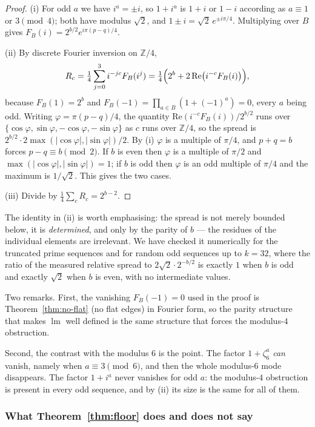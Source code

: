 \documentclass[11pt,a4paper]{article}
\theoremstyle{plain}
\theoremstyle{definition}
\theoremstyle{remark}
\DeclareMathOperator{\lm}{lm}
\begin{document}
\begin{proof}
(i) For odd $a$ we have $i^{a}=\pm i$, so $1+i^{a}$ is $1+i$ or $1-i$ according
as $a\equiv1$ or $3\pmod4$; both have modulus $\sqrt2$, and
$1\pm i=\sqrt2\,e^{\pm i\pi/4}$. Multiplying over $B$ gives
$F_B(i)=2^{b/2}e^{i\pi(p-q)/4}$.

(ii) By discrete Fourier inversion on $\mathbb{Z}/4$,
\[
  R_c=\tfrac14\sum_{j=0}^{3}i^{-jc}F_B(i^{j})
     =\tfrac14\Bigl(2^{b}+2\,\mathrm{Re}\bigl(i^{-c}F_B(i)\bigr)\Bigr),
\]
because $F_B(1)=2^{b}$ and $F_B(-1)=\prod_{a\in B}(1+(-1)^{a})=0$, every $a$
being odd. Writing $\varphi=\pi(p-q)/4$, the quantity
$\mathrm{Re}(i^{-c}F_B(i))/2^{b/2}$ runs over
$\{\cos\varphi,\sin\varphi,-\cos\varphi,-\sin\varphi\}$ as $c$ runs over
$\mathbb{Z}/4$, so the spread is $2^{b/2}\cdot2\max(|\cos\varphi|,|\sin\varphi|)/2$.
By (i) $\varphi$ is a multiple of $\pi/4$, and $p+q=b$ forces
$p-q\equiv b\pmod2$. If $b$ is even then $\varphi$ is a multiple of $\pi/2$ and
$\max(|\cos\varphi|,|\sin\varphi|)=1$; if $b$ is odd then $\varphi$ is an odd
multiple of $\pi/4$ and the maximum is $1/\sqrt2$. This gives the two cases.

(iii) Divide by $\tfrac14\sum_cR_c=2^{b-2}$.
\end{proof}

The identity in (ii) is worth emphasising: the spread is not merely bounded
below, it is \emph{determined}, and only by the parity of $b$ --- the residues
of the individual elements are irrelevant. We have checked it numerically for
the truncated prime sequences and for random odd sequences up to $k=32$, where
the ratio of the measured relative spread to $2\sqrt2\cdot2^{-b/2}$ is exactly
$1$ when $b$ is odd and exactly $\sqrt2$ when $b$ is even, with no intermediate
values.

Two remarks. First, the vanishing $F_B(-1)=0$ used in the proof is
Theorem~\ref{thm:no-flat} (no flat edges) in Fourier form, so the parity
structure that makes $\lm$ well defined is the same structure that forces the
modulus-$4$ obstruction.

Second, the contrast with the modulus $6$ is the point. The factor
$1+\zeta_6^{a}$ \emph{can} vanish, namely when $a\equiv3\pmod6$, and then the
whole modulus-$6$ mode disappears. The factor $1+i^{a}$ never vanishes for odd
$a$: the modulus-$4$ obstruction is present in every odd sequence, and by (ii)
its size is the same for all of them.

\subsubsection*{What Theorem~\ref{thm:floor} does and does not say}
\end{document}
